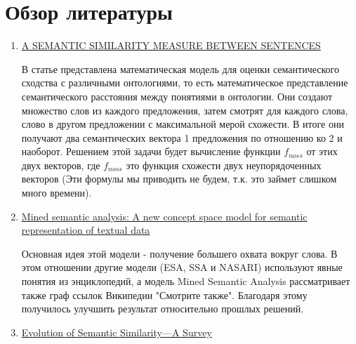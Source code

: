 \documentclass[12pt]{article}
\begin{document}
\newpage

\section{Обзор литературы}

\begin{enumerate}
	\item  \href{https://www.researchgate.net/publication/272088094_A_SEMANTIC_SIMILARITY_MEASURE_BETWEEN_SENTENCES}{A SEMANTIC SIMILARITY MEASURE BETWEEN SENTENCES}
	
	В статье представлена математическая модель для оценки семантического сходства с различными онтологиями, то есть математическое представление семантического расстояния между понятиями в онтологии. Они создают множество слов из каждого предложения, затем смотрят для каждого слова, слово в другом предложении с максимальной мерой схожести. В итоге они получают два семантических вектора 1 предложения по отношению ко 2 и наоборот. Решением этой задачи будет вычисление функции $f_{noss}$ от этих двух векторов, где $f_{noss}$ это функция схожести двух неупорядоченных векторов (Эти формулы мы приводить не будем, т.к. это займет слишком много времени).
	
	\item \href{https://www.researchgate.net/publication/322512205_Mined_semantic_analysis_A_new_concept_space_model_for_semantic_representation_of_textual_data}{Mined semantic analysis: A new concept space model for semantic representation of textual data}
	
	Основная идея этой модели - получение большего охвата вокруг слова. В этом отношении другие модели (ESA, SSA и NASARI) используют явные понятия из энциклопедий, а модель Mined Semantic Analysis рассматривает также граф ссылок Википедии "Смотрите также". Благодаря этому получилось улучшить результат относительно прошлых решений.
	
	\item \href{https://www.researchgate.net/publication/349481951_Evolution_of_Semantic_Similarity-A_Survey}{Evolution of Semantic Similarity—A Survey}
	

\end{enumerate}
\end{document}
